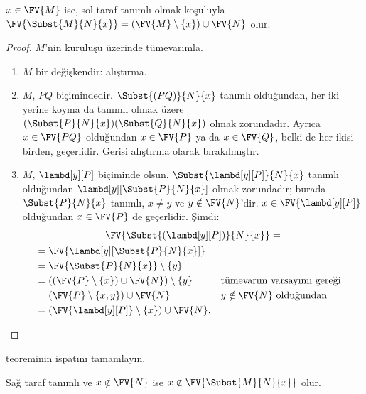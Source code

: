 \begin{thm} 
  $x \in \FV{M}$ ise, sol taraf tanımlı olmak koşuluyla
  $\FV{\Subst{M}{N}{x}} = (\FV{M} \setminus \{x\}) \cup \FV{N}$ olur.
\end{thm}

\begin{proof}
  $M$'nin kuruluşu üzerinde tümevarımla.
  \begin{enumerate}
  \item $M$ bir değişkendir: alıştırma.
  \item $M$, $PQ$ biçimindedir. $\Subst{(PQ)}{N}{x}$ tanımlı olduğundan,
    her iki yerine koyma da tanımlı olmak üzere
    $(\Subst{P}{N}{x})(\Subst{Q}{N}{x})$ olmak zorundadır. Ayrıca
    $x\in\FV{PQ}$ olduğundan $x\in\FV{P}$ ya da $x\in\FV{Q}$, belki de
    her ikisi birden, geçerlidir. Gerisi alıştırma olarak bırakılmıştır.
  \item $M$, $\lambd[y][P]$ biçiminde olsun.
    $\Subst{\lambd[y][P]}{N}{x}$ tanımlı olduğundan
    $\lambd[y][\Subst{P}{N}{x}]$ olmak zorundadır; burada
    $\Subst{P}{N}{x}$ tanımlı, $x\neq y$ ve $y\notin\FV{N}$'dir.
    $x\in\FV{\lambd[y][P]}$ olduğundan $x\in\FV{P}$ de geçerlidir. Şimdi:
    \begin{multline*}
      \FV{\Subst{(\lambd[y][P])}{N}{x}} = \\
      \begin{aligned}
      & = \FV{\lambd[y][\Subst{P}{N}{x}]} \\
      & = \FV{\Subst{P}{N}{x}} \setminus \{y\} \\
      & = ((\FV{P} \setminus \{x\}) \cup \FV{N}) \setminus \{y\}
       && \text{tümevarım varsayımı gereği} \\
      & = (\FV{P} \setminus \{x, y\}) \cup \FV{N}
       && \text{$y \notin \FV{N}$ olduğundan} \\
      & = (\FV{\lambd[y][P]} \setminus \{x\}) \cup \FV{N}.
      \end{aligned}
      \end{multline*}
  \end{enumerate}
\end{proof}

\begin{prob}
   teoreminin ispatını tamamlayın.
\end{prob}

\begin{thm}
  Sağ taraf tanımlı ve $x\notin\FV{N}$ ise
  $x \notin \FV{\Subst{M}{N}{x}}$ olur.
\end{thm}

